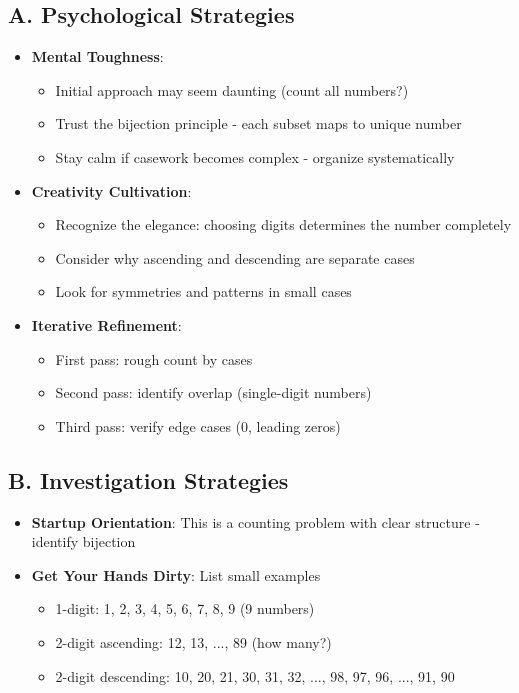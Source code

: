 \documentclass[]{article}
\begin{document}
\begin{strategicbox}
\subsection*{A. Psychological Strategies}
\begin{itemize}[leftmargin=*]
    \item \textbf{Mental Toughness}: 
    \begin{itemize}
        \item Initial approach may seem daunting (count all numbers?)
        \item Trust the bijection principle - each subset maps to unique number
        \item Stay calm if casework becomes complex - organize systematically
    \end{itemize}
    
    \item \textbf{Creativity Cultivation}: 
    \begin{itemize}
        \item Recognize the elegance: choosing digits determines the number completely
        \item Consider why ascending and descending are separate cases
        \item Look for symmetries and patterns in small cases
    \end{itemize}
    
    \item \textbf{Iterative Refinement}: 
    \begin{itemize}
        \item First pass: rough count by cases
        \item Second pass: identify overlap (single-digit numbers)
        \item Third pass: verify edge cases (0, leading zeros)
    \end{itemize}
\end{itemize}

\subsection*{B. Investigation Strategies}
\begin{itemize}[leftmargin=*]
    \item \textbf{Startup Orientation}: This is a counting problem with clear structure - identify bijection
    
    \item \textbf{Get Your Hands Dirty}: List small examples
    \begin{itemize}
        \item 1-digit: 1, 2, 3, 4, 5, 6, 7, 8, 9 (9 numbers)
        \item 2-digit ascending: 12, 13, ..., 89 (how many?)
        \item 2-digit descending: 10, 20, 21, 30, 31, 32, ..., 98, 97, 96, ..., 91, 90
    \end{itemize}
    

\end{itemize}
\end{strategicbox}
\end{document}
